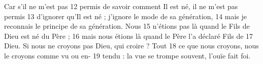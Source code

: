 Car s'il ne m'est pas	 
12	 	permis de savoir comment Il est né, il ne m'est pas permis	 
13	 	d'ignorer qu'Il est né ; j'ignore le mode de sa génération,	 
14	 	mais je reconnais le principe de sa génération. Nous	 
15	 	n'étions pas là quand le Fils de Dieu est né du Père ;	 
16	 	mais nous étions là quand le Père l'a déclaré Fils de	 
17	 	Dieu. Si nous ne croyons pas Dieu, qui croire ? Tout	 
18	 	ce que nous croyons, nous le croyons comme vu ou en-	 
19	 	tendu : la vue se trompe souvent, l'ouïe fait foi.
